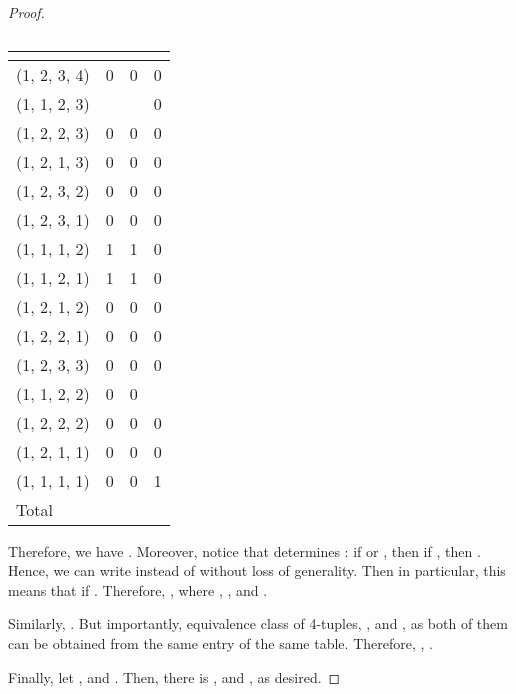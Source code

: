 \documentclass{article}
\begin{document}
\begin{proof}
\begin{table}[h]
\centering
\begin{tabular}{llll}
\multicolumn{1}{l|}{}        &  &  &  \\ \hline
\multicolumn{1}{l|}{(1, 2, 3, 4)} & 0           & 0        & 0             \\
\multicolumn{1}{l|}{(1, 1, 2, 3)} &              &              & 0             \\
\multicolumn{1}{l|}{(1, 2, 2, 3)} & 0           & 0             & 0             \\
\multicolumn{1}{l|}{(1, 2, 1, 3)} & 0           & 0             & 0             \\
\multicolumn{1}{l|}{(1, 2, 3, 2)} & 0           & 0             & 0             \\
\multicolumn{1}{l|}{(1, 2, 3, 1)} & 0           & 0             & 0             \\
\multicolumn{1}{l|}{(1, 1, 1, 2)} & 1             & 1             & 0             \\
\multicolumn{1}{l|}{(1, 1, 2, 1)} & 1             & 1             & 0             \\
\multicolumn{1}{l|}{(1, 2, 1, 2)} & 0             & 0             & 0             \\
\multicolumn{1}{l|}{(1, 2, 2, 1)} & 0             & 0             & 0             \\
\multicolumn{1}{l|}{(1, 2, 3, 3)} & 0             & 0             & 0        \\
\multicolumn{1}{l|}{(1, 1, 2, 2)} & 0             & 0             &              \\
\multicolumn{1}{l|}{(1, 2, 2, 2)} & 0             & 0             & 0             \\
\multicolumn{1}{l|}{(1, 2, 1, 1)} & 0             & 0             & 0             \\
\multicolumn{1}{l|}{(1, 1, 1, 1)} & 0             & 0             & 1             \\ \hline
\multicolumn{1}{l|}{Total}                             &             &             &           
\end{tabular}
\caption{}
\label{table:mS}
\end{table}

Therefore, we have . Moreover, notice that  determines : if  or , then  if , then . Hence, we can write  instead of  without loss of generality. Then in particular, this means that  if . Therefore, , where , , and . 

Similarly, . But importantly,  equivalence class of 4-tuples, , and , as both of them can be obtained from the same entry of the same table. Therefore, , .

Finally, let , and . Then, there is , and , as desired.
\end{proof}
\end{document}
